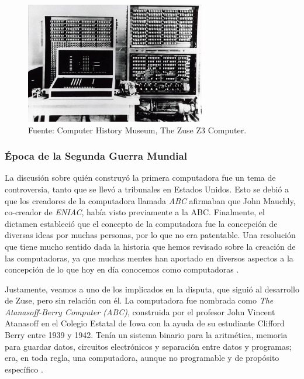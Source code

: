 \documentclass[letterpaper,12pt,oneside]{book}
\begin{document}
		\begin{figure}
		    \centering
		    \includegraphics[width=0.7\textwidth]{media/Historia/CHM_computers_1941.zusez3.jpg}
		    \caption{Fuente: Computer History Museum, The Zuse Z3 Computer.}
	    	\label{fig:zuse_z3}
		\end{figure}
		
		
		
        \subsubsection{Época de la Segunda Guerra Mundial}
		
		La discusión sobre quién construyó la primera computadora fue un tema de controversia, tanto que se llevó a tribunales en Estados Unidos. Esto se debió a que los creadores
		de la computadora llamada \textit{ABC} afirmaban que John Mauchly, co-creador de \textit{ENIAC}, había visto previamente a la ABC. Finalmente, el dictamen estableció
		que el concepto de la computadora fue la concepción de diversas ideas por muchas personas, por lo que no era patentable. Una resolución que tiene mucho sentido
		dada la historia que hemos revisado sobre la creación de las computadoras, ya que muchas mentes han aportado en diversos aspectos a la concepción de lo que hoy
		en día conocemos como computadoras \cite{computer_history_museum_computers_nodate}.
		
		
		Justamente, veamos a uno de los implicados en la disputa, que siguió al desarrollo de Zuse, pero sin relación con él. La computadora fue nombrada como 
		\textit{The Atanasoff-Berry Computer (ABC)}, construida por el profesor John Vincent Atanasoff 
		en el Colegio Estatal de Iowa con la ayuda de su estudiante Clifford Berry entre 1939 y 1942. Tenía un sistema binario para la aritmética, memoria
		para guardar datos, circuitos electrónicos y separación entre datos y programas; era, en toda regla, una computadora, aunque no programable y de propósito
		específico \cite[pp. 212-218]{ifrah_universal_2001}.
  
\end{document}
